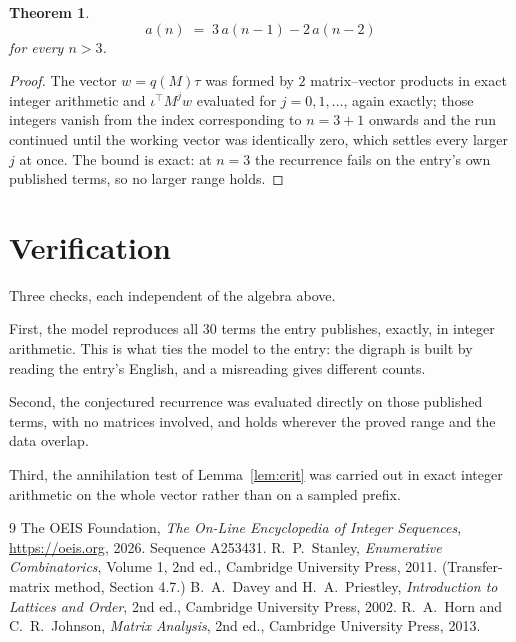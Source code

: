 \documentclass[11pt,a4paper]{article}
\theoremstyle{plain}
\newtheorem{theorem}{Theorem}
\theoremstyle{definition}
\begin{document}
\begin{theorem}
\[
a(n)\;=\;3\,a(n-1) - 2\,a(n-2)
\]
for every $n>3$.
\end{theorem}

\begin{proof}
The vector $w=q(M)\tau$ was formed by $2$ matrix--vector products in exact integer
arithmetic and $\iota^{\!\top}M^{j}w$ evaluated for $j=0,1,\dots$, again exactly; those
integers vanish from the index corresponding to $n=3+1$ onwards and the run continued
until the working vector was identically zero, which settles every larger $j$ at once. The bound is exact: at $n=3$ the recurrence fails on the entry's own published terms, so no larger range holds.
\end{proof}

\section{Verification}

Three checks, each independent of the algebra above.

First, the model reproduces all $30$ terms the entry publishes, exactly, in integer
arithmetic. This is what ties the model to the entry: the digraph is built by reading the
entry's English, and a misreading gives different counts.

Second, the conjectured recurrence was evaluated directly on those published terms, with no
matrices involved, and holds wherever the proved range and the data overlap.

Third, the annihilation test of Lemma~\ref{lem:crit} was carried out in exact integer
arithmetic on the whole vector rather than on a sampled prefix.

\begin{thebibliography}{9}
 The OEIS Foundation, \emph{The On-Line Encyclopedia of Integer
Sequences}, \url{https://oeis.org}, 2026. Sequence A253431.
 R.~P.~Stanley, \emph{Enumerative Combinatorics}, Volume 1, 2nd ed.,
Cambridge University Press, 2011. (Transfer-matrix method, Section 4.7.)
 B.~A.~Davey and H.~A.~Priestley, \emph{Introduction to Lattices and
Order}, 2nd ed., Cambridge University Press, 2002.
 R.~A.~Horn and C.~R.~Johnson, \emph{Matrix Analysis}, 2nd ed., Cambridge
University Press, 2013.
\end{thebibliography}
\end{document}
